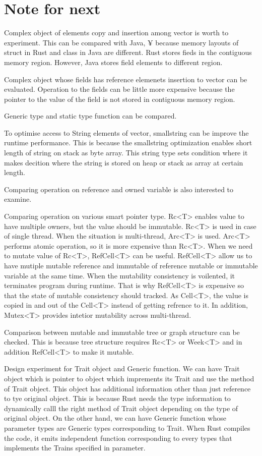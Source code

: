 \section{Note for next}
\label{sec:history}
Complex object of elements copy and insertion among vector is worth to experiment. This can be compared with Java, ¥
because memory layouts of struct in Rust and class in Java are different. Rust stores fieds in the contiguous memory region. 
However, Java stores field elements to different region.

Complex object whose fields has reference elemenets insertion to vector can be evaluated. Operation to the fields can be little 
more expensive because the pointer to the value of the field is not stored in contiguous memory region.

Generic type and static type function can be compared. 

To optimise access to String elements of vector, smallstring can be improve the runtime performance. 
This is because the smallstring optimization enables short length of string on stack as byte array. 
This string type sets condition where it makes decition where the string is stored on heap or stack as array at certain length.

Comparing operation on reference and owned variable is also interested to examine.

Comparing operation on various smart pointer type. 
Rc<T> enables value to have multiple owners, but the value should be immutable. Rc<T> is used in case of single thread. 
When the situation is multi-thread, Arc<T> is used. Arc<T> performs atomic operation, so it is more expensive than Rc<T>. 
When we need to mutate value of Rc<T>, RefCell<T> can be useful. RefCell<T> allow us to have mutiple mutable reference and immutable
of reference mutable or immutable variable at the same time. When the mutability consistency is voilented, it terminates program during runtime. 
That is why RefCell<T> is expensive so that the state of mutable consistency should tracked. 
As Cell<T>, the value is copied in and out of the Cell<T> instead of getting refrence to it. 
In addition, Mutex<T> provides intetior mutability across multi-thread.

Comparison between mutable and immutable tree or graph structure can be checked. 
This is because tree structure requires Rc<T> or Week<T> and in addition RefCell<T> to make it mutable.

Design experiment for Trait object and Generic function. 
We can have Trait object which is pointer to object which imprements its Trait and use the method of Trait object.
This object has additional information other than just reference to tye original object. 
This is because Rust needs the type information to dynamically calll the right method of Trait object depending on the type of 
original object.
On the other hand, we can have Generic function whose parameter types are Generic types corresponding to Trait. 
When Rust compiles the code, it emits independent function corresponding to every types that implements the Trains specified in parameter.


